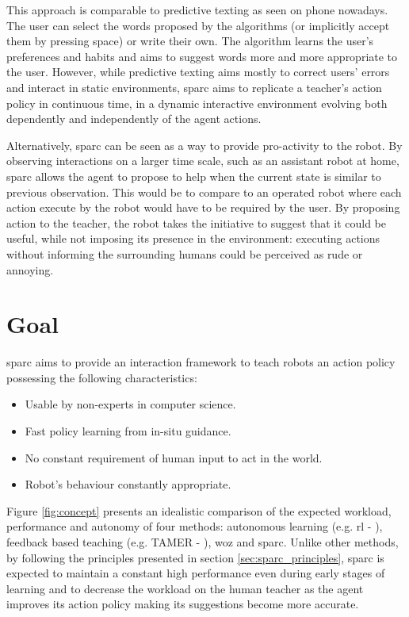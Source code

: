 This approach is comparable to predictive texting as seen on phone nowadays. The user can select the words proposed by the algorithms (or implicitly accept them by pressing space) or write their own. The algorithm learns the user's preferences and habits and aims to suggest words more and more appropriate to the user. However, while predictive texting aims mostly to correct users' errors and interact in static environments, \gls{sparc} aims to replicate a teacher's action policy in continuous time, in a dynamic interactive environment evolving both dependently and independently of the agent actions.

Alternatively, \gls{sparc} can be seen as a way to provide pro-activity to the robot. By observing interactions on a larger time scale, such as an assistant robot at home, \gls{sparc} allows the agent to propose to help when the current state is similar to previous observation. This would be to compare to an operated robot where each action execute by the robot would have to be required by the user. By proposing action to the teacher, the robot takes the initiative to suggest that it could be useful, while not imposing its presence in the environment: executing actions without informing the surrounding humans could be perceived as rude or annoying.

\section{Goal}

\gls{sparc} aims to provide an interaction framework to teach robots an action policy possessing the following characteristics:
\begin{itemize}
	\item Usable by non-experts in computer science.
	\item Fast policy learning from in-situ guidance.
	\item No constant requirement of human input to act in the world.
	\item Robot's behaviour constantly appropriate.
\end{itemize}

Figure \ref{fig:concept} presents an idealistic comparison of the expected workload, performance and autonomy of four methods: autonomous learning (e.g. \gls{rl} - \citealt{sutton1998reinforcement}), feedback based teaching (e.g. TAMER - \citealt{knox2009interactively}), \gls{woz} and \gls{sparc}. Unlike other methods, by following the principles presented in section \ref{sec:sparc_principles}, \gls{sparc} is expected to maintain a constant high performance even during early stages of learning and to decrease the workload on the human teacher as the agent improves its action policy making its suggestions become more accurate.

